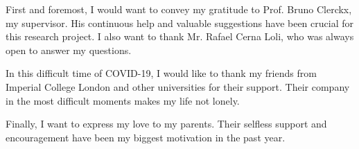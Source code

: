 \begin{acknowledgements}
    First and foremost, I would want to convey my gratitude to Prof. Bruno Clerckx, my supervisor. His continuous help and valuable suggestions
    have been crucial for this research project. I also want to thank Mr. Rafael Cerna Loli, who was always open to answer my questions.

    In this difficult time of COVID-19, I would like to thank my friends from Imperial College London and other universities for their support.
    Their company in the most difficult moments makes my life not lonely. 

    Finally, I want to express my love to my parents. Their selfless support and encouragement have been my biggest motivation in the past year.
\end{acknowledgements}